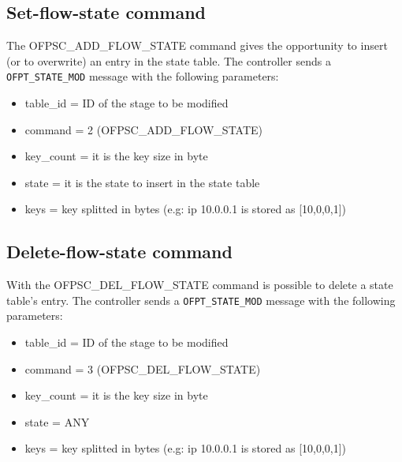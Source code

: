 
\subsection{Set-flow-state command}
\label{subsec:add_flow}

The OFPSC\_ADD\_FLOW\_STATE command gives the opportunity to insert (or to overwrite) an entry in the state table.
The controller sends a \texttt{OFPT\_STATE\_MOD} message with the following parameters:

\begin{itemize}
\item table\_id = ID of the stage to be modified
\item command = 2 (OFPSC\_ADD\_FLOW\_STATE)
\item key\_count = it is the key size in byte
\item state = it is the state to insert in the state table
\item keys = key splitted in bytes (e.g: ip 10.0.0.1 is stored as [10,0,0,1])
\end{itemize}



\subsection{Delete-flow-state command}
\label{subsec:del_flow}

With the OFPSC\_DEL\_FLOW\_STATE command is possible to delete a state table's entry.
The controller sends a \texttt{OFPT\_STATE\_MOD} message with the following parameters:

\begin{itemize}
\item table\_id = ID of the stage to be modified
\item command = 3 (OFPSC\_DEL\_FLOW\_STATE)
\item key\_count = it is the key size in byte
\item state = ANY
\item keys = key splitted in bytes (e.g: ip 10.0.0.1 is stored as [10,0,0,1])
\end{itemize}

